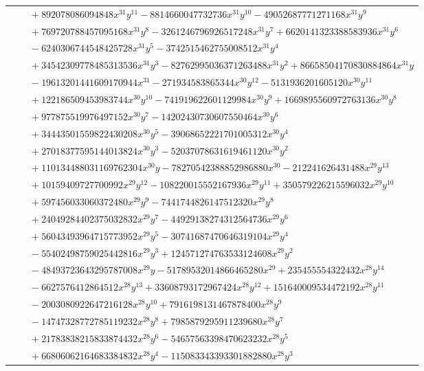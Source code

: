 \documentclass[11pt]{article}
\begin{document}
\begin{longtable}{@{}ll@{}}
 & $\quad +892078086094848x^{31}y^{11}-8814660047732736x^{31}y^{10}-49052687771271168x^{31}y^{9}$\\
 & $\quad +769720788457095168x^{31}y^{8}-3261246796926517248x^{31}y^{7}+6620141323388583936x^{31}y^{6}$\\
 & $\quad -6240306744548425728x^{31}y^{5}-3742515462755008512x^{31}y^{4}$\\
 & $\quad +34542309778485313536x^{31}y^{3}-82762995036371263488x^{31}y^{2}+86658504170830884864x^{31}y$\\
 & $\quad -19613201441609170944x^{31}-271934583865344x^{30}y^{12}-5131936201605120x^{30}y^{11}$\\
 & $\quad +122186509453983744x^{30}y^{10}-741919622601129984x^{30}y^{9}+1669895560972763136x^{30}y^{8}$\\
 & $\quad +977875519976497152x^{30}y^{7}-14202430730607550464x^{30}y^{6}$\\
 & $\quad +34443501559822430208x^{30}y^{5}-39068652221701005312x^{30}y^{4}$\\
 & $\quad +27018377595144013824x^{30}y^{3}-52037078631619461120x^{30}y^{2}$\\
 & $\quad +110134488031169762304x^{30}y-78270542388852986880x^{30}-212241626431488x^{29}y^{13}$\\
 & $\quad +10159409727700992x^{29}y^{12}-108220015552167936x^{29}y^{11}+350579226215596032x^{29}y^{10}$\\
 & $\quad +597456033060372480x^{29}y^{9}-7441744826147512320x^{29}y^{8}$\\
 & $\quad +24049284402375032832x^{29}y^{7}-44929138274312564736x^{29}y^{6}$\\
 & $\quad +56043493964715773952x^{29}y^{5}-30741687470646319104x^{29}y^{4}$\\
 & $\quad -55402498759025442816x^{29}y^{3}+124571274763533124608x^{29}y^{2}$\\
 & $\quad -48493723643295787008x^{29}y-51789532014866465280x^{29}+235455554322432x^{28}y^{14}$\\
 & $\quad -6627576412864512x^{28}y^{13}+33608793172967424x^{28}y^{12}+151640009534472192x^{28}y^{11}$\\
 & $\quad -2003080922647216128x^{28}y^{10}+7916198131467878400x^{28}y^{9}$\\
 & $\quad -14747328772785119232x^{28}y^{8}+7985879295911239680x^{28}y^{7}$\\
 & $\quad +21783838215833874432x^{28}y^{6}-54657563398470623232x^{28}y^{5}$\\
 & $\quad +66806062164683384832x^{28}y^{4}-115083343393301882880x^{28}y^{3}$\\

\end{longtable}
\end{document}

